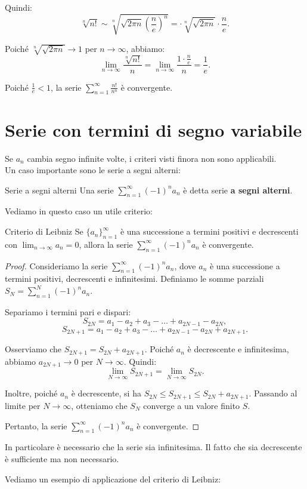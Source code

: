 Quindi:
\[
\sqrt[n]{n!} \sim \sqrt[n]{ \sqrt{2\pi n} \left( \frac{n}{e} \right)^n} = \cdot \sqrt[n]{\sqrt{2\pi n}} \cdot \frac{n}{e}.
\]

Poiché $\sqrt[n]{\sqrt{2\pi n}} \to 1$ per $n \to \infty$, abbiamo:
\[
\lim_{n \to \infty} \frac{\sqrt[n]{n!}}{n} = \lim_{n \to \infty} \frac{ 1 \cdot \frac{n}{e}}{n} = \frac{1}{e}.
\]

Poiché $\frac{1}{e} < 1$, la serie $\sum_{n=1}^{\infty} \frac{n!}{n^n}$ è convergente.

\section{Serie con termini di segno variabile}
Se $a_n$ cambia segno infinite volte, i criteri visti finora non sono applicabili.\\
Un caso importante sono le serie a segni alterni:
\begin{definizione}{Serie a segni alterni}
  Una serie $\sum_{n=1}^{\infty} (-1)^n a_n$ è detta serie \textbf{a segni alterni}.
\end{definizione}
Vediamo in questo caso un utile criterio:
\begin{teorema}{Criterio di Leibniz}
  Se $\{a_n\}_{n=1}^{\infty}$ è una successione a termini positivi e decrescenti con $\lim_{n \to \infty} a_n = 0$, allora la serie $\sum_{n=1}^{\infty} (-1)^n a_n$ è convergente.
\end{teorema}

\begin{proof}
Consideriamo la serie $\sum_{n=1}^{\infty} (-1)^n a_n$, dove $a_n$ è una successione a termini positivi, decrescenti e infinitesimi. Definiamo le somme parziali $S_N = \sum_{n=1}^{N} (-1)^n a_n$.

Separiamo i termini pari e dispari:
\[
S_{2N} = a_1 - a_2 + a_3 - \dots + a_{2N-1} - a_{2N},
\]
\[
S_{2N+1} = a_1 - a_2 + a_3 - \dots + a_{2N-1} - a_{2N} + a_{2N+1}.
\]

Osserviamo che $S_{2N+1} = S_{2N} + a_{2N+1}$. Poiché $a_n$ è decrescente e infinitesima, abbiamo $a_{2N+1} \to 0$ per $N \to \infty$. Quindi:
\[
\lim_{N \to \infty} S_{2N+1} = \lim_{N \to \infty} S_{2N}.
\]

Inoltre, poiché $a_n$ è decrescente, si ha $S_{2N} \leq S_{2N+1} \leq S_{2N} + a_{2N+1}$. Passando al limite per $N \to \infty$, otteniamo che $S_N$ converge a un valore finito $S$.

Pertanto, la serie $\sum_{n=1}^{\infty} (-1)^n a_n$ è convergente.
\end{proof}
\begin{osservazione}{}
  In particolare è necessario che la serie sia infinitesima. Il fatto che sia decrescente è sufficiente ma non necessario.
\end{osservazione}
Vediamo un esempio di applicazione del criterio di Leibniz:\\

